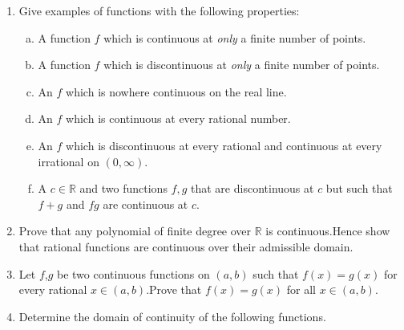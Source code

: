 \documentclass[journal,12pt,onecolumn]{IEEEtran}
\begin{document}
\begin{enumerate}
\begin{enumerate}[(i)]
\begin{multicols}{2}
\end{multicols}
\end{enumerate}


\item Give examples of functions with the following properties:
\setlength\itemsep{2em}
\begin{enumerate}[(a)]

\item A function $f$ which is continuous at \textit{only} a finite number of points.
\item A function $f$ which is discontinuous at \textit{only} a finite number of points.
\item An $f$ which is nowhere continuous on the real line.
\item An $f$ which is continuous at every rational number.
\item An $f$ which is discontinuous at every rational and continuous at every irrational on $(0,\infty)$.
\item A $c \in \mathbb{R}$ and two functions $f, g$ that are discontinuous at $c$ but such that $f+g$ and $fg$ are continuous at $c$.
\end{enumerate}

\item Prove that any polynomial of finite degree over $\mathbb{R}$ is continuous.Hence show that rational functions are continuous over their admissible domain.

\item Let $f$,$g$ be two continuous functions on $(a,b)$ such that $f(x)=g(x)$ for every rational $x\in (a,b)$.Prove that $f(x)=g(x)$ for all $x \in (a,b)$.

\item Determine the domain of continuity of the following functions.

\begin{enumerate}[(i)]
\end{enumerate}
\end{enumerate}
\end{document}
